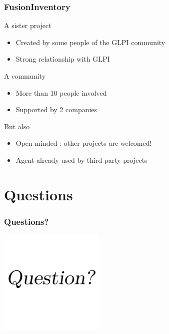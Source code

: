\documentclass{beamer}
\begin{document}
\begin{frame}

    \frametitle{FusionInventory}

    \begin{block}{A sister project}
        \begin{itemize}
            \item Created by some people of the GLPI community
            \item Strong relationship with GLPI
        \end{itemize}
    \end{block}

    \begin{block}{A community}
        \begin{itemize}
            \item More than 10 people involved
            \item Supported by 2 companies
        \end{itemize}
    \end{block}

    \begin{block}{But also}
        \begin{itemize}
            \item Open minded : other projects are welcomed!
            \item Agent already used by third party projects
        \end{itemize}
    \end{block}

\end{frame}

\section{Questions}

\begin{frame}
    \frametitle{Questions?}

    \begin{center}

    \includegraphics[height=5cm]{./pics/question.pdf}

    \end{center}

\end{frame}
\end{document}
